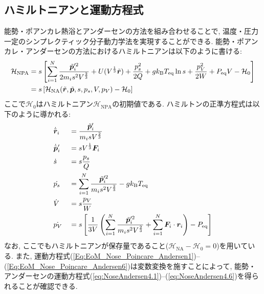 \subsection{ハミルトニアンと運動方程式}
能勢・ポアンカレ熱浴とアンダーセンの方法を組み合わせることで, 温度・圧力一定のシンプレクティック分子動力学法を実現することができる\cite{Sturgeon2000}.
能勢・ポアンカレ・アンダーセンの方法におけるハミルトニアンは以下のように書ける:
\begin{align}
  \mathcal{H}_{\mathrm{NPA}}
  &=
  s
  \left[
    \sum_{i=1}^{N}
    \frac{\Tilde{\bm{p}}_{i}^{\prime 2}}{2m_{i}s^{2}V^{\frac{2}{3}}}
    +
    U(V^{\frac{1}{3}} \Tilde{\bm{r}})
    +
    \frac{p_{s}^{2}}{2Q}
    +
    g k_{\mathrm{B}} T_{\mathrm{eq}} \ln s
    +
    \frac{p_{V}^{2}}{2W}
    +
    P_{\mathrm{eq}} V
    - 
    \mathcal{H}_{0}
  \right]
  \\
  &=
  s
  \left[
    \mathcal{H}_{\mathrm{NA}}
    (\Tilde{\bm{r}}, \Tilde{\bm{p}}, s, p_{s}, V, p_{V})
    -
    \mathcal{H}_{0}
  \right]
\end{align}
ここで$\mathcal{H}_{0}$はハミルトニアン$\mathcal{H}_{\mathrm{NPA}}$の初期値である. ハミルトンの正準方程式は以下のように導かれる:
\begin{alignat}{3}
  &
  \dot{\Tilde{\bm{r}}}_{i}
  &&=
  \frac{\Tilde{\bm{p}}_{i}^{\prime}}{m_{i} s V^{\frac{2}{3}}}
  \label{Eq:EoM_Nose_Poincare_Andersen1}
  \\
  &
  \dot{\Tilde{\bm{p}}}_{i}^{\prime}
  &&=
  s V^{\frac{1}{3}} \bm{F}_{i}
  \label{Eq:EoM_Nose_Poincare_Andersen2}
  \\
  &
  \dot{s}
  &&=
  s \frac{p_{s}}{Q}
  \label{Eq:EoM_Nose_Poincare_Andersen3}
  \\
  &
  \dot{p_{s}}
  &&=
  \sum_{i=1}^{N}
  \frac{\Tilde{\bm{p}}_{i}^{\prime 2}}{m_{i}s^{2}V^{\frac{2}{3}}}
  -
  g k_{\mathrm{B}} T_{\mathrm{eq}}
  \label{Eq:EoM_Nose_Poincare_Andersen4}
  \\
  &
  \dot{V}
  &&=
  s \frac{p_{V}}{W}
  \label{Eq:EoM_Nose_Poincare_Andersen5}
  \\
  &
  \dot{p_{V}}
  &&=
  s
  \left[
    \frac{1}{3V}
    \left(
      \sum_{i=1}^{N}
      \frac{\Tilde{\bm{p}}_{i}^{\prime 2}}{m_{i}s^{2}V^{\frac{2}{3}}}
      +
      \sum_{i=1}^{N}
      \bm{F}_{i} \cdot \bm{r}_{i}
    \right)
    -
    P_{\mathrm{eq}}
  \right]
  \label{Eq:EoM_Nose_Poincare_Andersen6}
\end{alignat}
なお, ここでもハミルトニアンが保存量であること($\mathcal{H}_{\mathrm{NA}} - \mathcal{H}_{0} = 0$)を用いている.
また, 運動方程式(\ref{Eq:EoM_Nose_Poincare_Andersen1})--(\ref{Eq:EoM_Nose_Poincare_Andersen6})は変数変換を施すことによって, 能勢・アンダーセンの運動方程式(\ref{eq:NoseAndersen4.1})--(\ref{eq:NoseAndersen4.6})を得られることが確認できる.


